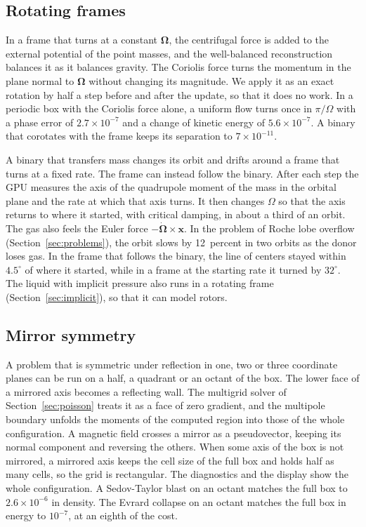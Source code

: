 \documentclass[twocolumn]{aastex701}
\begin{document}
\subsection{Rotating frames}
\label{sec:rotating}

In a frame that turns at a constant $\boldsymbol\Omega$, the centrifugal force is added to the external potential of the point masses, and the well-balanced reconstruction balances it as it balances gravity. The Coriolis force turns the momentum in the plane normal to $\boldsymbol\Omega$ without changing its magnitude. We apply it as an exact rotation by half a step before and after the update, so that it does no work. In a periodic box with the Coriolis force alone, a uniform flow turns once in $\pi/\Omega$ with a phase error of $2.7\times10^{-7}$ and a change of kinetic energy of $5.6\times10^{-7}$. A binary that corotates with the frame keeps its separation to $7\times10^{-11}$.

A binary that transfers mass changes its orbit and drifts around a frame that turns at a fixed rate. The frame can instead follow the binary. After each step the GPU measures the axis of the quadrupole moment of the mass in the orbital plane and the rate at which that axis turns. It then changes $\Omega$ so that the axis returns to where it started, with critical damping, in about a third of an orbit. The gas also feels the Euler force $-\dot{\boldsymbol\Omega}\times\mathbf{x}$. In the problem of Roche lobe overflow (Section~\ref{sec:problems}), the orbit slows by 12~percent in two orbits as the donor loses gas. In the frame that follows the binary, the line of centers stayed within $4.5^\circ$ of where it started, while in a frame at the starting rate it turned by $32^\circ$. The liquid with implicit pressure also runs in a rotating frame (Section~\ref{sec:implicit}), so that it can model rotors.

\subsection{Mirror symmetry}
\label{sec:mirror}

A problem that is symmetric under reflection in one, two or three coordinate planes can be run on a half, a quadrant or an octant of the box. The lower face of a mirrored axis becomes a reflecting wall. The multigrid solver of Section~\ref{sec:poisson} treats it as a face of zero gradient, and the multipole boundary unfolds the moments of the computed region into those of the whole configuration. A magnetic field crosses a mirror as a pseudovector, keeping its normal component and reversing the others. When some axis of the box is not mirrored, a mirrored axis keeps the cell size of the full box and holds half as many cells, so the grid is rectangular. The diagnostics and the display show the whole configuration. A Sedov-Taylor blast on an octant matches the full box to $2.6\times10^{-6}$ in density. The Evrard collapse on an octant matches the full box in energy to $10^{-7}$, at an eighth of the cost.
\end{document}
